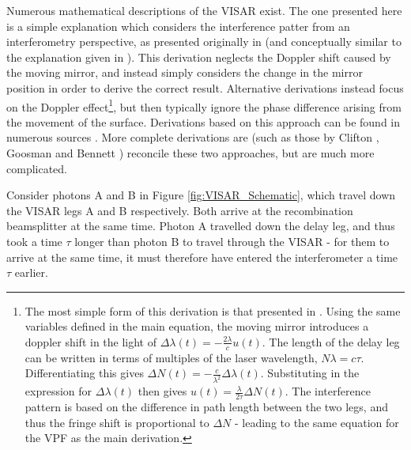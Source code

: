 Numerous mathematical descriptions of the VISAR exist. The one presented here is a simple explanation which considers the interference patter from an interferometry perspective, as presented originally in \cite{Barker1968} (and conceptually similar to the explanation given in \cite{Barker2000}). This derivation neglects the Doppler shift caused by the moving mirror, and instead simply considers the change in the mirror position in order to derive the correct result. Alternative derivations instead focus on the Doppler effect\footnote{The most simple form of this derivation is that presented in \cite{Barker1968}. Using the same variables defined in the main equation, the moving mirror introduces a doppler shift in the light of $\Delta \lambda (t) = - \frac{2 \lambda}{c} u(t)$. The length of the delay leg can be written in terms of multiples of the laser wavelength, $N \lambda = c \tau$. Differentiating this gives $\Delta N(t) = - \frac{c}{\lambda^2}\Delta \lambda (t)$. Substituting in the expression for $\Delta \lambda (t)$ then gives $u(t) = \frac{\lambda}{2\tau} \Delta N(t)$. The interference pattern is based on the difference in path length between the two legs, and thus the fringe shift is proportional to $\Delta N$ - leading to the same equation for the VPF as the main derivation.}, but then typically ignore the phase difference arising from the movement of the surface. Derivations based on this approach can be found in numerous sources \cite{Barker1968, Barker1972, Barker2000, Hammel2018}. More complete derivations are (such as those by Clifton \cite{Goosman1975a}, Goosman \cite{Goosman1975} and Bennett \cite{Bennett2016}) reconcile these two approaches, but are much more complicated.

Consider photons A and B in Figure \ref{fig:VISAR_Schematic}, which travel down the VISAR legs A and B respectively. Both arrive at the recombination beamsplitter at the same time. Photon A travelled down the delay leg, and thus took a time $\tau$ longer than photon B to travel through the VISAR - for them to arrive at the same time, it must therefore have entered the interferometer a time $\tau$ earlier.

